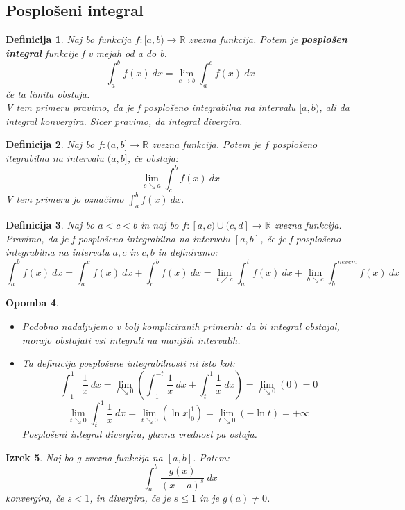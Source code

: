 \documentclass[11pt]{article}
\newtheorem{Izrek}{{\sc Izrek}}[section]
\newtheorem{Definicija}[Izrek]{{\sc Definicija}}
\newtheorem{Opomba}[Izrek]{{\sc Opomba}}
\begin{document}
\subsection{Posplošeni integral}
\begin{Definicija}
	Naj bo funkcija $f:[a,b) \to \mathbb{R}$ zvezna funkcija. Potem je \textbf{posplošen integral} funkcije f v mejah od a do b.
	$$\int_{a}^{b}{f(x)\ dx} = \lim\limits_{c\to b}\int_{a}^{c}{f(x)\ dx}$$
	če ta limita obstaja.
	\\
	V tem primeru pravimo, da je f posplošeno integrabilna na intervalu $[a,b)$, ali da integral konvergira. Sicer pravimo, da integral divergira.
\end{Definicija}
\begin{Definicija}
	Naj bo $f:(a,b] \to \mathbb{R}$ zvezna funkcija. Potem je $f$ posplošeno itegrabilna na intervalu $(a,b]$, če obstaja:
	$$\lim\limits_{c\searrow a}{\int_{c}^{b}{f(x) \ dx}}$$
	V tem primeru jo označimo $\int_{a}^{b}{f(x)\ dx}$.
\end{Definicija}
\begin{Definicija}
	Naj bo $a < c < b$ in naj bo $f:[a,c) \cup (c,d] \to \mathbb{R}$ zvezna funkcija. Pravimo, da je f posplošeno integrabilna na intervalu $[a,b]$, če je f posplošeno integrabilna na intervalu $a,c$ in $c,b$ in definiramo:
	$$\int_{a}^{b}{f(x) \ dx} = \int_{a}^{c}{f(x) \ dx} + \int_{c}^{b}{f(x) \ dx} = \lim\limits_{t \nearrow c}{\int_{a}^{t}{f(x) \ dx}} + \lim\limits_{b\searrow c}{\int_{b}^{nevem}{f(x) \ dx}}$$
\end{Definicija}
\begin{Opomba}
	\begin{itemize}
		\item
		Podobno nadaljujemo v bolj kompliciranih primerih: da bi integral obstajal, morajo obstajati vsi integrali na manjših intervalih.
		\item
		Ta definicija posplošene integrabilnosti ni isto kot:
		$$\int_{-1}^{1}{\frac{1}{x} \ dx} = \lim\limits_{t\searrow 0}{\left( \int_{-1}^{-t}{\frac{1}{x} \ dx} + \int_{t}^{1}{\frac{1}{x}\ dx}\right)} = \lim\limits_{t 
		\searrow 0}{(0)} = 0$$
		$$\lim\limits_{t \searrow 0}{\int_{t}^{1}{\frac{1}{x} \ dx}} = \lim\limits_{t\searrow 0}{(\ln{x}|^1_0)} = \lim\limits_{t \searrow 0}{(-\ln{t})}= + \infty$$
		Posplošeni integral divergira, glavna vrednost pa ostaja.
	\end{itemize}
\end{Opomba}
\begin{Izrek}
	Naj bo g zvezna funkcija na $[a,b]$. Potem:
	$$\int_{a}^{b}{\frac{g(x)}{(x-a)^s}\ dx} $$
	konvergira, če $s < 1$, in divergira, če je $s \le 1$ in je $g(a) \ne 0$.
\end{Izrek}
\end{document}
